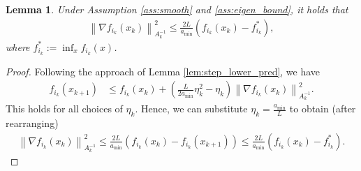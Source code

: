 \documentclass{article}
\newtheorem{lemma}[theorem]{Lemma}
\newcommand{\norm}[1]{\left \lVert #1 \right \rVert}
\DeclareMathOperator{\tr}{Tr}
\begin{document}
\begin{lemma} \label{lem:value_bb} Under Assumption \ref{ass:smooth} and \ref{ass:eigen_bound}, it holds that
    \begin{align*}
        \norm{\nabla f_{i_k} (x_k)}^2_{A_k^{-1}} \leq \frac{2 L}{a_{\min}} (f_{i_k}(x_k) - f_{i_k}^*), 
    \end{align*}
    where $f_{i_k}^* := \inf_{x} f_{i_k}(x)$. 
\end{lemma}
\begin{proof}
    Following the approach of Lemma \ref{lem:step_lower_pred}, we have
    \begin{align*}
        f_{i_k}(x_{k+1}) &\leq f_{i_k}(x_k) + (\frac{L}{2 a_{\min}} \eta_k^2 - \eta_k)  \norm{\nabla f_{i_k} (x_k)}^2_{A_k^{-1}}. 
    \end{align*}
    This holds for all choices of $\eta_k$. Hence, we can substitute $\eta_k = \frac{a_{\min}}{L}$ to obtain (after rearranging)
    \begin{align*}
         \norm{\nabla f_{i_k} (x_k)}^2_{A_k^{-1}} \leq \frac{2 L}{a_{\min}} (f_{i_k}(x_k) - f_{i_k}(x_{k+1})) \leq \frac{2 L}{a_{\min}} (f_{i_k}(x_k) - f_{i_k}^*).
    \end{align*}
\end{proof}


\end{document}
